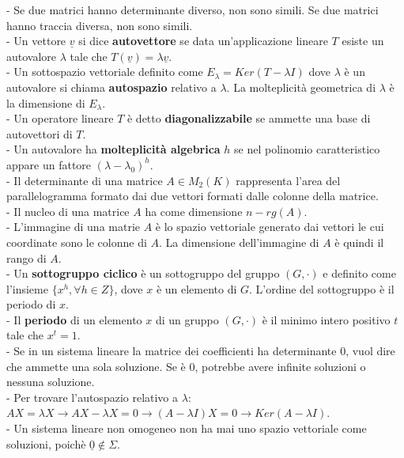 \documentclass[a4paper,10pt]{article} %
\renewcommand{\b}[1]{%
    {\textbf{#1}}}
\renewcommand{\v}[1]{%
    {\underline{#1}}}
\begin{document}
- Se due matrici hanno determinante diverso, non sono simili. Se due matrici hanno traccia diversa, non sono simili.\\
- Un vettore $\v{v}$ si dice \b{autovettore} se data un'applicazione lineare $T$ esiste un autovalore $\lambda$ tale che $T(\v{v}) = \lambda \v{v}$.\\
- Un sottospazio vettoriale definito come $E_{\lambda} = Ker(T - \lambda I)$ dove $\lambda$ è un autovalore si chiama \b{autospazio} relativo a $\lambda$. La molteplicità geometrica di $\lambda$ è la dimensione di $E_{\lambda}$.\\
- Un operatore lineare $T$ è detto \b{diagonalizzabile} se ammette una base di autovettori di $T$.\\
- Un autovalore ha \b{molteplicità algebrica} $h$ se nel polinomio caratteristico appare un fattore $(\lambda - \lambda_0)^h$.\\
- Il determinante di una matrice $A \in M_2(K)$ rappresenta l'area del parallelogramma formato dai due vettori formati dalle colonne della matrice.\\
- Il nucleo di una matrice $A$ ha come dimensione $n - rg(A)$.\\
- L'immagine di una matrie $A$ è lo spazio vettoriale generato dai vettori le cui coordinate sono le colonne di $A$. La dimensione dell'immagine di $A$ è quindi il rango di $A$.\\
- Un \b{sottogruppo ciclico} è un sottogruppo del gruppo $(G, \cdot)$ e definito come l'insieme $\{x^h, \forall h \in Z \}$, dove $x$ è un elemento di $G$. L'ordine del sottogruppo è il periodo di $x$.\\
- Il \b{periodo} di un elemento $x$ di un gruppo $(G, \cdot)$ è il minimo intero positivo $t$ tale che $x^t = 1$.\\
- Se in un sistema lineare la matrice dei coefficienti ha determinante $0$, vuol dire che ammette una sola soluzione. Se è $0$, potrebbe avere infinite soluzioni o nessuna soluzione.\\
- Per trovare l'autospazio relativo a $\lambda$: $AX = \lambda X \rightarrow AX - \lambda X = 0 \rightarrow (A - \lambda I)X = 0 \rightarrow Ker(A - \lambda I)$.\\
- Un sistema lineare non omogeneo non ha mai uno spazio vettoriale come soluzioni, poichè $\v{0} \not \in \Sigma$.\\
\end{document}
